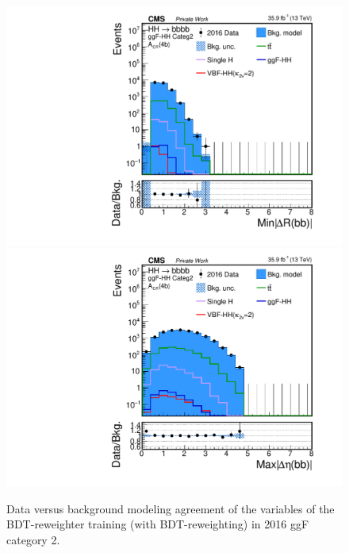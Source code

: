 \begin{figure}[htbp!]
\begin{center}
\includegraphics[width=0.24\linewidth]{Figures/Modeling/background/plotsDatadrivenWithBDT/2016/GGFcateg2_CR_110/Histogram/plot2016_min_4b_deltaR_Btag4_GGFcateg2_CR_110_Histogram_log.pdf}
\includegraphics[width=0.24\linewidth]{Figures/Modeling/background/plotsDatadrivenWithBDT/2016/GGFcateg2_CR_110/Histogram/plot2016_max_4b_deltaEta_Btag4_GGFcateg2_CR_110_Histogram_log.pdf}
\end{center}
\caption{Data versus background modeling agreement of the variables of the BDT-reweighter training (with  BDT-reweighting) in 2016 ggF category 2.}
\label{bkg:fig:bdtregvarggf2_2016}
\end{figure}

